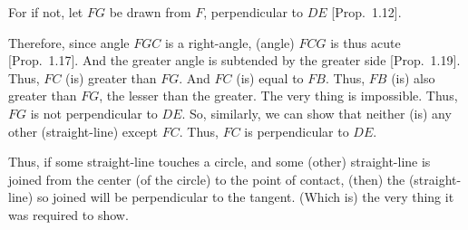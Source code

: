 \begin{Parallel}{}{}
{For if not, let $FG$ be drawn from $F$, perpendicular to $DE$ [Prop.~1.12].

Therefore, since angle $FGC$ is a right-angle, (angle) $FCG$ is thus acute [Prop.~1.17]. And the greater angle is subtended by the greater side [Prop.~1.19]. Thus, $FC$ (is) greater than $FG$. And $FC$ (is) equal to
$FB$. Thus, $FB$ (is)  also greater than $FG$, the lesser than the greater.
The very thing is impossible. Thus, $FG$ is not perpendicular to
$DE$. So, similarly, we can show that neither (is) any other
(straight-line) except $FC$. Thus, $FC$ is perpendicular  to $DE$.

\epsfysize=2.2in
\centerline{}

Thus, if some straight-line  touches a circle, and some (other) straight-line is
joined from the center (of the circle) to the point of contact, (then) the (straight-line)
so joined will be perpendicular to the tangent. (Which is)
the very thing it was required to show.}
\end{Parallel}

